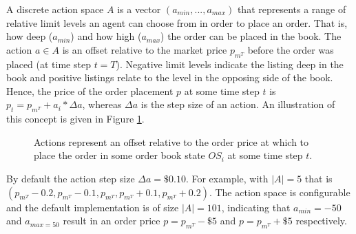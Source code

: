 A discrete action space $A$ is a vector $(a_{min}, . . . , a_{max})$ that represents a range of relative limit levels an agent can choose from in order to place an order. 
That is, how deep ($a_{min}$) and how high ($a_{max}$) the order can be placed in the book.
The action $a \in A$ is an offset relative to the market price $p_{m^T}$ before the order was placed (at time step $t=T$).
Negative limit levels indicate the listing deep in the book and positive listings relate to the level in the opposing side of the book.
Hence, the price of the order placement $p$ at some time step $t$ is $p_t = p_{m^T} + a_i * \Delta{a}$, whereas $\Delta{a}$ is the step size of an action.
An illustration of this concept is given in Figure \ref{fig:setup-actions}.
\begin{figure}[H]
    \centering
    \caption{Actions represent an offset relative to the order price at which to place the order in some order book state $OS_i$ at some time step $t$.}
    \label{fig:setup-actions}
\end{figure}

By default the action step size $\Delta{a}=\$0.10$.
For example, with $|A|=5$ that is $(p_{m^T}-0.2, p_{m^T}-0.1, p_{m^T}, p_{m^T}+0.1, p_{m^T}+0.2)$.
The action space is configurable and the default implementation is of size $|A|=101$, indicating that $a_{min}=-50$ and $a_{max=50}$ result in an order price $p=p_{m^T}-\$5$ and $p=p_{m^T}+\$5$ respectively.

